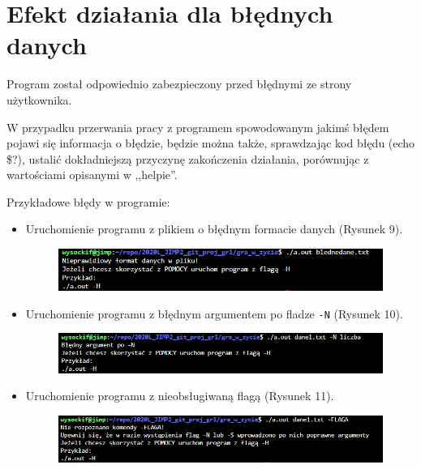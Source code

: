 \documentclass{article}
\begin{document}
\section{Efekt działania dla błędnych danych}
{\fontsize{14}{14}\selectfont
Program został odpowiednio zabezpieczony przed błędnymi ze strony użytkownika.

\newline

W przypadku przerwania pracy z programem spowodowanym jakimś błędem pojawi się informacja o błędzie, będzie można także, sprawdzając kod błędu (echo \$?), ustalić dokładniejszą przyczynę zakończenia działania, porównując z wartościami opisanymi w ,,helpie''.

Przykładowe błędy w programie:
\begin{itemize}
    \item Uruchomienie programu z plikiem o błędnym formacie danych (Rysunek 9).

\begin{figure}[h]
\centering
\includegraphics[width=11cm]{blednedane1.png}
\caption{}
\label{fig:blednedane1.png}
\end{figure}

\item Uruchomienie programu z błędnym argumentem po fladze \texttt{-N} (Rysunek 10).

\begin{figure}[h]
\centering
\includegraphics[width=11cm]{blednedane2.png}
\caption{}
\label{fig:blednedane2.png}
\end{figure}

\item Uruchomienie programu z nieobsługiwaną flagą (Rysunek 11).

\begin{figure}[h]
\centering
\includegraphics[width=11cm]{blednedane3.png}
\caption{}
\label{fig:blednedane3.png}
\end{figure}

\end{itemize}


}
\newpage
\end{document}
